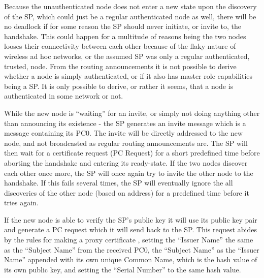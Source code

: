 Because the unauthenticated node does not enter a new state upon the discovery
of the \ac{SP}, which could just be a regular authenticated node as well, there
will be no deadlock if for some reason the \ac{SP} should never initiate, or
invite to, the handshake. This could happen for a multitude of reasons being
the two nodes looses their connectivity between each other because of the flaky
nature of wireless ad hoc networks, or the assumed \ac{SP} was only a regular
authenticated, trusted, node. From the routing announcements it is not possible
to derive whether a node is simply authenticated, or if it also has master role
capabilities being a \ac{SP}. It is only possible to derive, or rather it seems,
that a node is authenticated in some network or not.


While the new node is ``waiting'' for an invite, or simply not doing anything
other than announcing its existence - the \ac{SP} generates an invite message
which is a message containing its \ac{PC0}. The invite will be directly
addressed to the new node, and not broadcasted as regular routing announcements
are. The \ac{SP} will then wait for a certificate request (\ac{PC} Request) for
a short predefined time before aborting the handshake and entering its
ready-state. If the two nodes discover each other once more, the \ac{SP} will
once again try to invite the other node to the handshake. If this fails several
times, the \ac{SP} will eventually ignore the all discoveries of the other node
(based on address) for a predefined time before it tries again.

If the new node is able to verify the SP's public key it will use its public
key pair and generate a \ac{PC} request which it will send back to the \ac{SP}.
This request abides by the rules for making a proxy certificate \cite{rfc3820},
setting the ``Issuer Name'' the same as the ``Subject Name'' from the received
\ac{PC0}, the ``Subject Name'' as the ``Issuer Name'' appended with its own
unique Common Name, which is the hash value of its own public key, and setting
the ``Serial Number'' to the same hash value.

